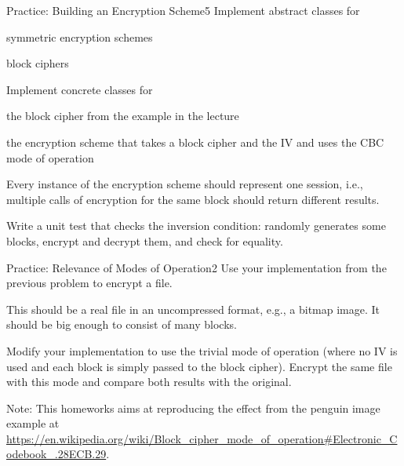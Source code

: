 \documentclass[a4paper]{article}
\begin{document}
\header

\begin{problem}{Practice: Building an Encryption Scheme}{5}
Implement abstract classes for
\begin{compactitem}
 \item symmetric encryption schemes
 \item block ciphers
\end{compactitem}

Implement concrete classes for
\begin{compactitem}
 \item the block cipher from the example in the lecture
 \item the encryption scheme that takes a block cipher and the IV and uses the CBC mode of operation
\end{compactitem} 
Every instance of the encryption scheme should represent one session, i.e., multiple calls of encryption for the same block should return different results.

Write a unit test that checks the inversion condition: randomly generates some blocks, encrypt and decrypt them, and check for equality.
\end{problem}

\begin{problem}{Practice: Relevance of Modes of Operation}{2}
Use your implementation from the previous problem to encrypt a file.

This should be a real file in an uncompressed format, e.g., a bitmap image.
It should be big enough to consist of many blocks.

Modify your implementation to use the trivial mode of operation (where no IV is used and each block is simply passed to the block cipher).
Encrypt the same file with this mode and compare both results with the original.

Note: This homeworks aims at reproducing the effect from the penguin image example at \url{https://en.wikipedia.org/wiki/Block_cipher_mode_of_operation#Electronic_Codebook_.28ECB.29}.
\end{problem}
\end{document}
